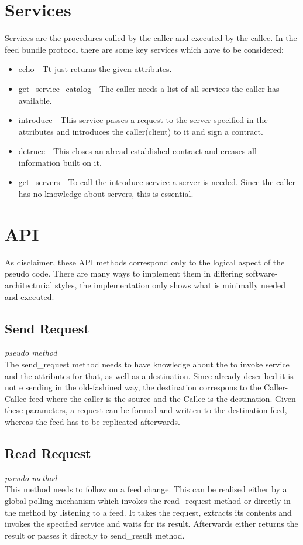 \section{Services}
Services are the procedures called by the caller and executed by the callee. In the feed bundle protocol there are some key services which have to be considered:
\begin{itemize}
    \item echo - Tt just returns the given attributes.
    \item get\_service\_catalog - The caller needs a list of all services the caller has available.
    \item introduce - This service passes a request to the server specified in the attributes and introduces the caller(client) to it and sign a contract.
    \item detruce - This closes an alread established contract and ereases all information built on it.
    \item get\_servers - To call the introduce service a server is needed. Since the caller has no knowledge about servers, this is essential.
\end{itemize}
\section{API}
As disclaimer, these API methods correspond only to the logical aspect of the pseudo code. There are many ways to implement them in differing software-architecturial styles, the implementation only shows what is minimally needed and executed.
\subsection{Send Request}
\textit{pseudo method}\\
The send\_request method needs to have knowledge about the to invoke service and the attributes for that, as well as a destination. Since already described it is not e sending in the old-fashined way, the destination correspons to the Caller-Callee feed where the caller is the source and the Callee is the destination. Given these parameters, a request can be formed and written to the destination feed, whereas the feed has to be replicated afterwards. 
\subsection{Read Request}
\textit{pseudo method}\\
This method needs to follow on a feed change. This can be realised either by a global polling mechanism which invokes the read\_request method or directly in the method by listening to a feed. It takes the request, extracts its contents and invokes the specified service and waits for its result. Afterwards either returns the result or passes it directly to send\_result method.
